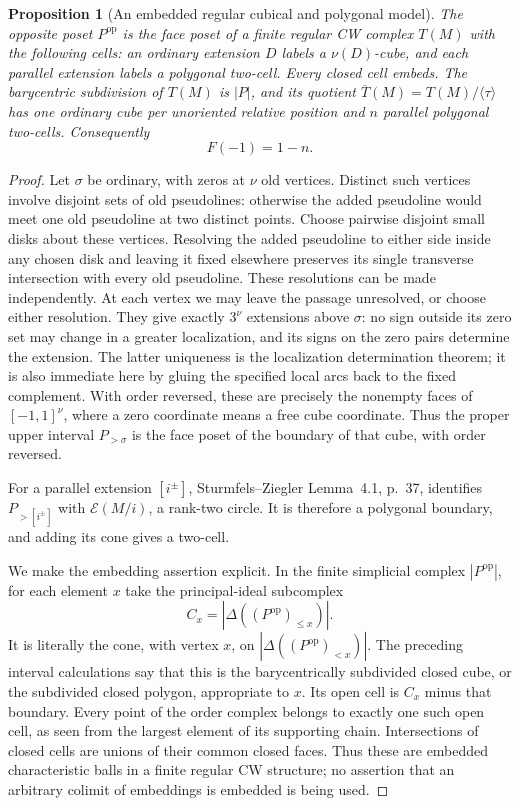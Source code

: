 \documentclass[11pt]{article}
\newtheorem{proposition}[theorem]{Proposition}
\theoremstyle{definition}\newtheorem{definition}[theorem]{Definition}
\begin{document}
\begin{proposition}[An embedded regular cubical and polygonal model]\label{prop:cubical-count}
The opposite poset $P^{\mathrm{op}}$ is the face poset of a finite regular CW
complex $T(M)$ with the following cells: an ordinary extension $D$ labels a
$\nu(D)$-cube, and each parallel extension labels a polygonal two-cell.
Every closed cell embeds. The barycentric subdivision of $T(M)$ is $|P|$,
and its quotient $\overline T(M)=T(M)/\langle\tau\rangle$ has one ordinary
cube per unoriented relative position and $n$ parallel polygonal two-cells.
Consequently
\[
 \boxed{F(-1)=1-n.}
\]
\end{proposition}
\begin{proof}
Let $\sigma$ be ordinary, with zeros at $\nu$ old vertices. Distinct such
vertices involve disjoint sets of old pseudolines: otherwise the added
pseudoline would meet one old pseudoline at two distinct points. Choose
pairwise disjoint small disks about these vertices. Resolving the added
pseudoline to either side inside any chosen disk and leaving it fixed
elsewhere preserves its single transverse intersection with every old
pseudoline. These resolutions can be made independently. At each vertex we
may leave the passage unresolved, or choose either resolution. They give
exactly $3^\nu$ extensions above $\sigma$: no sign outside its zero set may
change in a greater localization, and its signs on the zero pairs determine
the extension. The latter uniqueness is the localization determination
theorem; it is also immediate here by gluing the specified local arcs back
to the fixed complement. With order reversed, these are precisely the
nonempty faces of $[-1,1]^\nu$, where a zero coordinate means a free cube
coordinate. Thus the proper upper interval $P_{>\sigma}$ is the face poset
of the boundary of that cube, with order reversed.

For a parallel extension $[i^\pm]$, Sturmfels--Ziegler Lemma~4.1, p.~37,
identifies $P_{>[i^\pm]}$ with $\mathcal E(M/i)$, a rank-two circle. It is
therefore a polygonal boundary, and adding its cone gives a two-cell.

We make the embedding assertion explicit. In the finite simplicial complex
$|P^{\mathrm{op}}|$, for each element $x$ take the principal-ideal
subcomplex
\[
 C_x=|\Delta((P^{\mathrm{op}})_{\leq x})|.
\]
It is literally the cone, with vertex $x$, on
$|\Delta((P^{\mathrm{op}})_{<x})|$. The preceding interval calculations say
that this is the barycentrically subdivided closed cube, or the subdivided
closed polygon, appropriate to $x$. Its open cell is $C_x$ minus that
boundary. Every point of the order complex belongs to exactly one such
open cell, as seen from the largest element of its supporting chain.
Intersections of closed cells are unions of their common closed faces.
Thus these are embedded characteristic balls in a finite regular CW
structure; no assertion that an arbitrary colimit of embeddings is embedded
is being used.


\end{proof}
\end{document}
